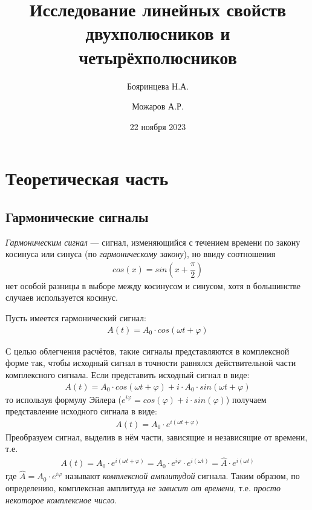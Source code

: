 \documentclass[a4paper, usenames, dvipsnames]{article}
\title{Исследование линейных свойств двухполюсников и четырёхполюсников}
\author{Бояринцева Н.А. \and Можаров А.Р.}
\date{22 ноября 2023}
\begin{document}
\maketitle

\section*{\centering Теоретическая часть}

\subsection*{Гармонические сигналы}

{\it Гармоническим сигнал} --- сигнал, изменяющийся с течением времени
по закону косинуса или синуса (по {\it гармоническому закону}),
но ввиду соотношения
\begin{gather*}
    cos(x) = sin\left(x + \dfrac{\pi}{2}\right)
\end{gather*}
нет особой разницы в выборе между косинусом и синусом,
хотя в большинстве случаев используется косинус.

Пусть имеется гармонический сигнал:
\begin{gather*}
    A(t) = A_0 \cdot cos(\omega t + \varphi)
\end{gather*}

С целью облегчения расчётов,
такие сигналы представляются в комплексной форме так,
чтобы исходный сигнал в точности равнялся действительной части комплексного сигнала.
Если представить исходный сигнал в виде:
\begin{gather*}
    A(t) = A_0 \cdot cos(\omega t + \varphi) + i \cdot A_0 \cdot sin(\omega t + \varphi)
\end{gather*}
то используя формулу Эйлера ($e^{i\varphi} = cos(\varphi) + i \cdot sin(\varphi)$)
получаем представление исходного сигнала в виде:
\begin{gather*}
    A(t) = A_0 \cdot e^{i(\omega t + \varphi)}
\end{gather*}
Преобразуем сигнал, выделив в нём части,
зависящие и независящие от времени, т.е.
\begin{gather*}
    A(t) = A_0 \cdot e^{i(\omega t + \varphi)} =
    A_0 \cdot e^{i\varphi} \cdot e^{i(\omega t)} =
    \hat{A} \cdot e^{i(\omega t)}
\end{gather*}
где $\hat{A} = A_0 \cdot e^{i\varphi}$ называют {\it комплексной амплитудой} сигнала.
Таким образом, по определению, комплексная амплитуда {\it не зависит от времени},
т.е. {\it просто некоторое комплексное число}.
\end{document}
